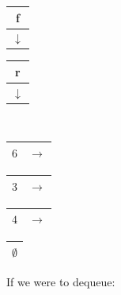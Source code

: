 \documentclass[nobib]{tufte-handout}
\begin{document}
\begin{table}
    \centering
    \begin{tabular}{|c|}
        \hline
        f \\
        \hline
        $\downarrow$\\
        \hline
    \end{tabular}
    \hspace{6.3em}
    \begin{tabular}{|c|}
        \hline
        r \\
        \hline
        $\downarrow$\\
        \hline
    \end{tabular}
    \hspace{3.5em} \quad \hspace{1em}
    \\
    \begin{tabular}{|c|c|}
        \hline
        $6$ & $\rightarrow$ \\
        \hline
    \end{tabular}
    \begin{tabular}{|c|c|}
        \hline
        $3$ & $\rightarrow$ \\
        \hline
    \end{tabular}
    \begin{tabular}{|c|c|}
        \hline
        $4$ & $\rightarrow$ \\
        \hline
    \end{tabular}
    \begin{tabular}{|c|}
        \hline
        $\emptyset$ \\
        \hline
    \end{tabular}
\end{table}
If we were to dequeue:\\
\end{document}
